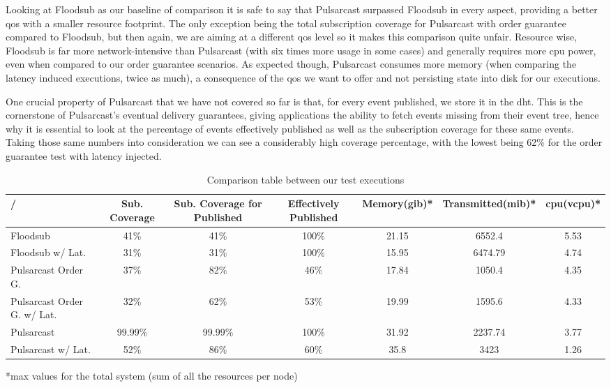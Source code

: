 Looking at Floodsub as our baseline of comparison it is safe to say that
Pulsarcast surpassed Floodsub in every aspect, providing a better
\acrshort{qos} with a smaller resource footprint.  The only exception being the
total subscription coverage for Pulsarcast with order guarantee compared to
Floodsub, but then again, we are aiming at a different \acrshort{qos} level so
it makes this comparison quite unfair.  Resource wise, Floodsub is far more
network-intensive than Pulsarcast (with six times more usage in some cases) and
generally requires more \acrshort{cpu} power, even when compared to our order
guarantee scenarios. As expected though, Pulsarcast consumes more memory (when
comparing the latency induced executions, twice as much), a consequence  of the
\acrshort{qos} we want to offer and not persisting state into disk for our
executions.

One crucial property of Pulsarcast that we have not covered so far is that, for
every event published, we store it in the \acrshort{dht}. This is the
cornerstone of Pulsarcast's eventual delivery guarantees, giving applications
the ability to fetch events missing from their event tree, hence why it is
essential to look at the percentage of events effectively published as well as
the subscription coverage for these same events. Taking those same numbers into
consideration we can see a considerably high coverage percentage, with the
lowest being 62\% for the order guarantee test with latency injected.

\begin{table}
\caption{Comparison table between our test executions}
\label{table:evaluation-comparison}
  \begin{center}
   \begin{tabular}{|l| c c c c c c|} 
   \hline
   / & Sub. Coverage &  Sub. Coverage for Published & Effectively Published &
   Memory(\acrshort{gib})* & Transmitted(\acrshort{mib})* & \acrshort{cpu}(\acrshort{vcpu})* \\ [0.5ex] 
   \hline\hline
   Floodsub & 41\% & 41\% & 100\% & 21.15 & 6552.4 & 5.53 \\
   Floodsub w/ Lat. & 31\% & 31\% & 100\% & 15.95 & 6474.79 & 4.74 \\
   Pulsarcast Order G. & 37\% & 82\% & 46\% & 17.84 & 1050.4 & 4.35 \\
   Pulsarcast Order G. w/ Lat. & 32\% & 62\% & 53\% & 19.99 & 1595.6 & 4.33 \\
   Pulsarcast & 99.99\% & 99.99\% &  100\% & 31.92 & 2237.74 & 3.77 \\
   Pulsarcast w/ Lat. & 52\% & 86\% & 60\% & 35.8 & 3423 & 1.26\\
   \hline
  \end{tabular}
  \footnotesize{*max values for the total system (sum of all the resources per node)}
  \end{center}
\end{table}
